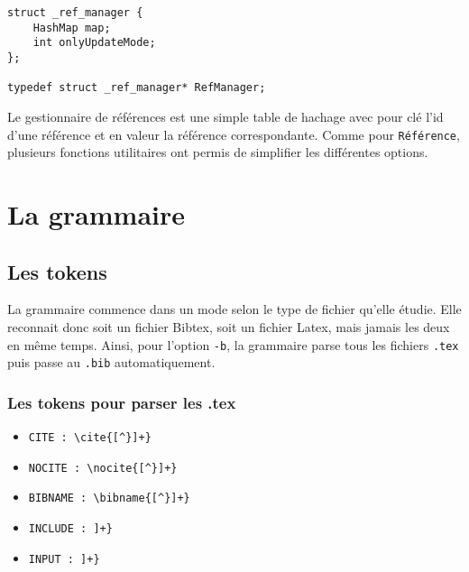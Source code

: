 \documentclass[hidelinks, a4paper,11pt,twoside,final]{article}
\begin{document}
\begin{lstlisting}
struct _ref_manager {
	HashMap map;
	int onlyUpdateMode;
};

typedef struct _ref_manager* RefManager;
\end{lstlisting}

Le gestionnaire de références est une simple table de hachage avec pour clé l'id d'une référence et en valeur la référence correspondante.
Comme pour \texttt{Référence}, plusieurs fonctions utilitaires ont permis de simplifier les différentes options.

\section{La grammaire}
\subsection{Les tokens}
La grammaire commence dans un mode selon le type de fichier qu'elle étudie. Elle reconnait donc soit un fichier Bibtex, 
soit un fichier Latex, mais jamais les deux en même temps. Ainsi, pour l'option \texttt{-b}, la grammaire parse tous les fichiers \texttt{.tex} puis passe au \texttt{.bib} automatiquement.
\subsubsection {Les tokens pour parser les .tex}
\begin{itemize}
 \item \begin{verbatim}CITE : \cite{[^}]+}\end{verbatim}
 
 \item \begin{verbatim}NOCITE : \nocite{[^}]+}\end{verbatim}
 
 \item \begin{verbatim}BIBNAME : \bibname{[^}]+}\end{verbatim}
 
 \item \begin{verbatim}INCLUDE : ]+}\end{verbatim}
 
 \item \begin{verbatim}INPUT : ]+}\end{verbatim}
\end{itemize} 
\end{document}
